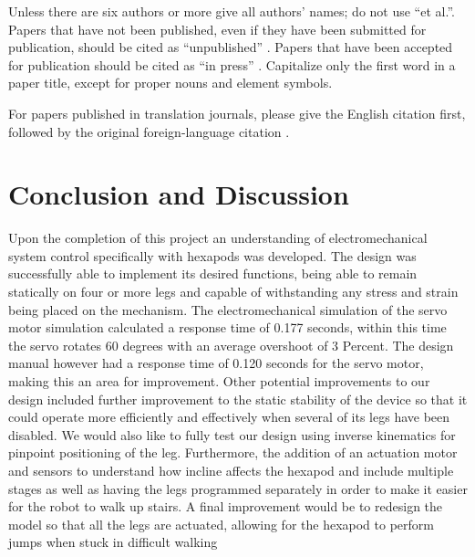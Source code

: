 Unless there are six authors or more give all authors' names; do not use 
``et al.''. Papers that have not been published, even if they have been 
submitted for publication, should be cited as ``unpublished'' \cite{gabriel1996dielectricI}. Papers 
that have been accepted for publication should be cited as ``in press'' \cite{gabriel1996dielectricI}. 
Capitalize only the first word in a paper title, except for proper nouns and 
element symbols.



For papers published in translation journals, please give the English 
citation first, followed by the original foreign-language citation \cite{khadem2019geometric}.












\section{Conclusion and Discussion}

Upon the completion of this project an understanding of electromechanical system control specifically with hexapods was developed. The design was successfully able to implement its desired functions, being able to remain statically on four or more legs and capable of withstanding any stress and strain being placed on the mechanism. The electromechanical simulation of the servo motor simulation calculated a response time of 0.177 seconds, within this time the servo rotates 60 degrees with an average overshoot of 3 Percent. The design manual however had a response time of 0.120 seconds for the servo motor, making this an area for improvement. Other potential improvements to our design included further improvement to the static stability of the device so that it could operate more efficiently and effectively when several of its legs have been disabled. We would also like to fully test our design using inverse kinematics for  pinpoint positioning of the leg. Furthermore, the addition of an  actuation motor and sensors to understand how incline affects the hexapod and include multiple stages as well as having the legs programmed separately in order to make it easier for the robot to walk up stairs. A final improvement would be to redesign the model so that all the legs are actuated, allowing for the hexapod to perform jumps when stuck in difficult walking









